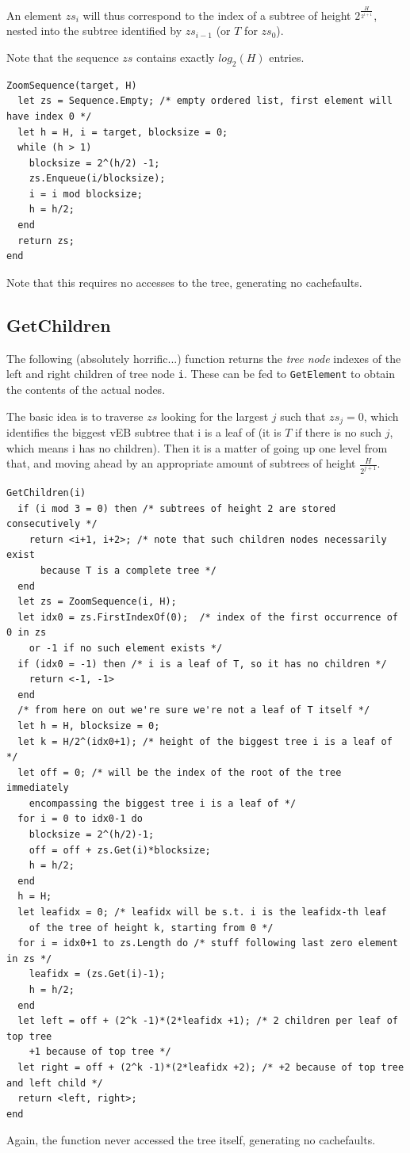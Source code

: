 \documentclass[a4paper]{article}
\begin{document}
An element $zs_i$ will thus correspond to the index of a subtree of height $2^\frac{H}{2^{i+1}}$, nested into the subtree identified by $zs_{i-1}$ (or $T$ for $zs_0$).

Note that the sequence $zs$ contains exactly $log_2(H)$ entries.
\begin{verbatim}
ZoomSequence(target, H)
  let zs = Sequence.Empty; /* empty ordered list, first element will have index 0 */
  let h = H, i = target, blocksize = 0;
  while (h > 1)
    blocksize = 2^(h/2) -1;
    zs.Enqueue(i/blocksize);
    i = i mod blocksize;
    h = h/2;
  end
  return zs;
end
\end{verbatim}

Note that this requires no accesses to the tree, generating no cachefaults.


\subsection*{GetChildren}
The following (absolutely horrific...) function returns the \emph{tree node} indexes of the left and right children of tree node \texttt{i}. These can be fed to \texttt{GetElement} to obtain the contents of the actual nodes.

The basic idea is to traverse $zs$ looking for the largest $j$ such that $zs_j = 0$, which identifies the biggest vEB subtree that i is a leaf of (it is $T$ if there is no such $j$, which means i has no children). Then it is a matter of going up one level from that, and moving ahead by an appropriate amount of subtrees of height $\frac{H}{2^{j+1}}$.
\begin{verbatim}
GetChildren(i)
  if (i mod 3 = 0) then /* subtrees of height 2 are stored consecutively */
    return <i+1, i+2>; /* note that such children nodes necessarily exist
      because T is a complete tree */
  end
  let zs = ZoomSequence(i, H);
  let idx0 = zs.FirstIndexOf(0);  /* index of the first occurrence of 0 in zs
    or -1 if no such element exists */
  if (idx0 = -1) then /* i is a leaf of T, so it has no children */
    return <-1, -1>
  end
  /* from here on out we're sure we're not a leaf of T itself */
  let h = H, blocksize = 0;
  let k = H/2^(idx0+1); /* height of the biggest tree i is a leaf of */
  let off = 0; /* will be the index of the root of the tree immediately
    encompassing the biggest tree i is a leaf of */
  for i = 0 to idx0-1 do
    blocksize = 2^(h/2)-1;
    off = off + zs.Get(i)*blocksize;
    h = h/2;
  end
  h = H;
  let leafidx = 0; /* leafidx will be s.t. i is the leafidx-th leaf
    of the tree of height k, starting from 0 */
  for i = idx0+1 to zs.Length do /* stuff following last zero element in zs */
    leafidx = (zs.Get(i)-1);
    h = h/2;
  end
  let left = off + (2^k -1)*(2*leafidx +1); /* 2 children per leaf of top tree
    +1 because of top tree */
  let right = off + (2^k -1)*(2*leafidx +2); /* +2 because of top tree and left child */
  return <left, right>;
end
\end{verbatim}
Again, the function never accessed the tree itself, generating no cachefaults.
\end{document}
